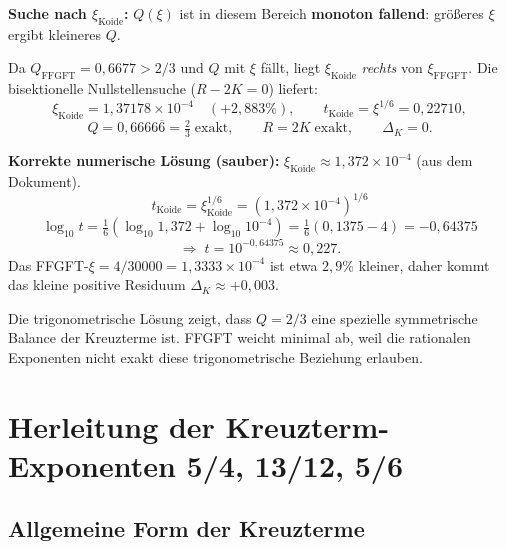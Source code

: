 \textbf{Suche nach $\xi_{\text{Koide}}$:}
$Q(\xi)$ ist in diesem Bereich \textbf{monoton fallend}:
größeres $\xi$ ergibt kleineres $Q$.

\begin{center}
\renewcommand{\arraystretch}{1.3}
\end{center}

Da $Q_{\text{FFGFT}}=0{,}6677>2/3$ und $Q$ mit $\xi$ fällt,
liegt $\xi_{\text{Koide}}$ \emph{rechts} von $\xi_{\text{FFGFT}}$.
Die bisektionelle Nullstellensuche ($R-2K=0$) liefert:
\[
  \xi_{\text{Koide}} = 1{,}37178\times10^{-4}
  \quad (+2{,}883\%),
  \qquad t_{\text{Koide}} = \xi^{1/6} = 0{,}22710,
\]
\[
  Q = 0{,}6666\overline{6} = \tfrac{2}{3}\;\text{exakt},
  \qquad R = 2K\;\text{exakt},
  \qquad \Delta_K = 0.
\]

\textbf{Korrekte numerische Lösung (sauber):}
$\xi_{\text{Koide}}\approx1{,}372\times10^{-4}$ (aus dem Dokument).
\[
  t_{\text{Koide}} = \xi_{\text{Koide}}^{1/6} = (1{,}372\times10^{-4})^{1/6}
\]
\[
  \log_{10}t = \tfrac{1}{6}(\log_{10}1{,}372+\log_{10}10^{-4})
  = \tfrac{1}{6}(0{,}1375-4) = -0{,}64375
\]
\[
  \Rightarrow\; t=10^{-0{,}64375}\approx0{,}227.
\]
Das FFGFT-$\xi=4/30000=1{,}3333\times10^{-4}$ ist etwa $2{,}9\%$ kleiner,
daher kommt das kleine positive Residuum $\Delta_K\approx+0{,}003$.

Die trigonometrische Lösung zeigt, dass $Q=2/3$ eine spezielle
symmetrische Balance der Kreuzterme ist.
FFGFT weicht minimal ab, weil die rationalen Exponenten nicht exakt
diese trigonometrische Beziehung erlauben.

\section{Herleitung der Kreuzterm-Exponenten 5/4, 13/12, 5/6}


\subsection{Allgemeine Form der Kreuzterme}

